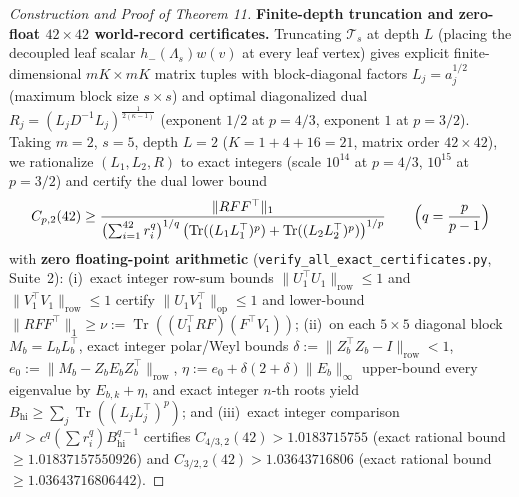 \documentclass[10pt,letterpaper]{article}
\newcommand{\Tr}{\operatorname{Tr}}
\newcommand{\op}{\mathrm{op}}
\begin{document}
\begin{proof}[Construction and Proof of Theorem 11]
\textbf{Finite-depth truncation and zero-float $42\times 42$ world-record certificates.} Truncating $\mathcal{T}_s$ at depth $L$ (placing the decoupled leaf scalar $h_-(\Lambda_s) w(v)$ at every leaf vertex) gives explicit finite-dimensional $m K \times m K$ matrix tuples with block-diagonal factors $L_j = a_j^{1/2}$ (maximum block size $s \times s$) and optimal diagonalized dual $R_j = (L_j D^{-1} L_j)^{\frac{1}{2(\kappa-1)}}$ (exponent $1/2$ at $p = 4/3$, exponent $1$ at $p = 3/2$). Taking $m = 2$, $s = 5$, depth $L = 2$ ($K = 1 + 4 + 16 = 21$, matrix order $42\times 42$), we rationalize $(L_1, L_2, R)$ to exact integers (scale $10^{14}$ at $p = 4/3$, $10^{15}$ at $p = 3/2$) and certify the dual lower bound~\cite[Lemma~2.1]{Holden2026b}
\[
  C_{p,2}(42) \ge \frac{\|R F F^\top\|_1}{\bigl(\sum_{i=1}^{42} r_i^q\bigr)^{1/q}\,\bigl(\Tr((L_1 L_1^\top)^p) + \Tr((L_2 L_2^\top)^p)\bigr)^{1/p}}
  \qquad \Bigl(q = \frac{p}{p-1}\Bigr)
\]
with \textbf{zero floating-point arithmetic} (\texttt{verify\_all\_exact\_certificates.py}, Suite~2): (i)~exact integer row-sum bounds $\|U_1^\top U_1\|_{\mathrm{row}} \le 1$ and $\|V_1^\top V_1\|_{\mathrm{row}} \le 1$ certify $\|U_1 V_1^\top\|_{\op} \le 1$ and lower-bound $\|R F F^\top\|_1 \ge \nu := \Tr((U_1^\top R F)(F^\top V_1))$; (ii)~on each $5\times 5$ diagonal block $M_b = L_b L_b^\top$, exact integer polar/Weyl bounds $\delta := \|Z_b^\top Z_b - I\|_{\mathrm{row}} < 1$, $e_0 := \|M_b - Z_b E_b Z_b^\top\|_{\mathrm{row}}$, $\eta := e_0 + \delta(2+\delta)\|E_b\|_\infty$ upper-bound every eigenvalue by $E_{b,k} + \eta$, and exact integer $n$-th roots yield $B_{\mathrm{hi}} \ge \sum_j \Tr((L_j L_j^\top)^p)$; and (iii)~exact integer comparison $\nu^q > c^q (\sum r_i^q) B_{\mathrm{hi}}^{q-1}$ certifies $C_{4/3,2}(42) > 1.0183715755$ (exact rational bound $\ge 1.01837157550926$) and $C_{3/2,2}(42) > 1.03643716806$ (exact rational bound $\ge 1.03643716806442$).
\end{proof}
\end{document}
